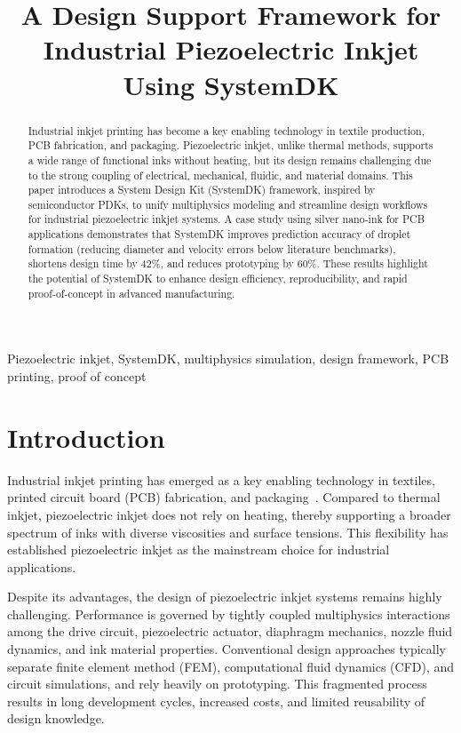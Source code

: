 \documentclass[conference]{IEEEtran}
\title{A Design Support Framework for Industrial Piezoelectric Inkjet Using SystemDK}
\author{%
  \IEEEauthorblockN{Shinichi Samizo}
  \IEEEauthorblockA{Independent Semiconductor Researcher\\
  Former Engineer at Seiko Epson Corporation\\
  Email: \href{mailto:shin3t72@gmail.com}{shin3t72@gmail.com}\\
  GitHub: \url{https://github.com/Samizo-AITL}}%
}
\begin{document}
\maketitle

\begin{abstract}
Industrial inkjet printing has become a key enabling technology in textile production, PCB fabrication, and packaging. 
Piezoelectric inkjet, unlike thermal methods, supports a wide range of functional inks without heating, but its design remains challenging due to the strong coupling of electrical, mechanical, fluidic, and material domains. 
This paper introduces a System Design Kit (SystemDK) framework, inspired by semiconductor PDKs, to unify multiphysics modeling and streamline design workflows for industrial piezoelectric inkjet systems. 
A case study using silver nano-ink for PCB applications demonstrates that SystemDK improves prediction accuracy of droplet formation (reducing diameter and velocity errors below literature benchmarks), shortens design time by 42\%, and reduces prototyping by 60\%. 
These results highlight the potential of SystemDK to enhance design efficiency, reproducibility, and rapid proof-of-concept in advanced manufacturing.
\end{abstract}

\begin{IEEEkeywords}
Piezoelectric inkjet, SystemDK, multiphysics simulation, design framework, PCB printing, proof of concept
\end{IEEEkeywords}

\section{Introduction}
Industrial inkjet printing has emerged as a key enabling technology in textiles, printed circuit board (PCB) fabrication, and packaging~\cite{derby2010,calvert2001}. 
Compared to thermal inkjet, piezoelectric inkjet does not rely on heating, thereby supporting a broader spectrum of inks with diverse viscosities and surface tensions. 
This flexibility has established piezoelectric inkjet as the mainstream choice for industrial applications.

Despite its advantages, the design of piezoelectric inkjet systems remains highly challenging. 
Performance is governed by tightly coupled multiphysics interactions among the drive circuit, piezoelectric actuator, diaphragm mechanics, nozzle fluid dynamics, and ink material properties. 
Conventional design approaches typically separate finite element method (FEM), computational fluid dynamics (CFD), and circuit simulations, and rely heavily on prototyping. 
This fragmented process results in long development cycles, increased costs, and limited reusability of design knowledge.
\end{document}
